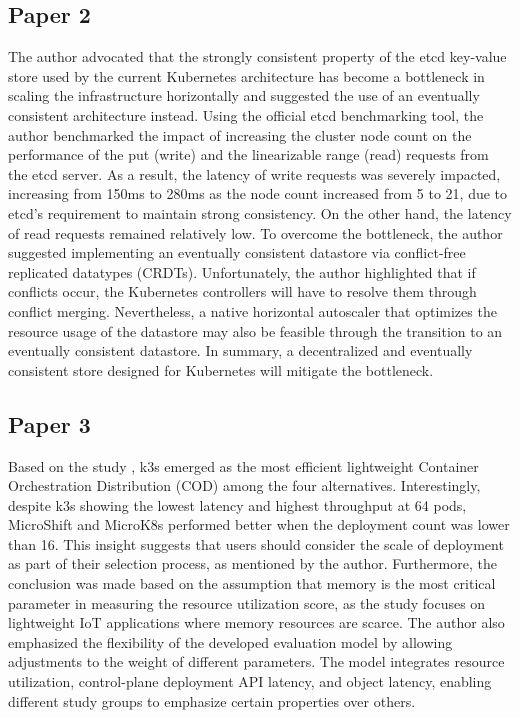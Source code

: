 \subsection{Paper 2}%
\label{sub:Paper 2}
The author \cite{C2} advocated that the strongly consistent property of the etcd key-value store used by the current Kubernetes architecture has become a bottleneck in scaling the infrastructure horizontally and suggested the use of an eventually consistent architecture instead.  
Using the official etcd benchmarking tool, the author benchmarked the impact of increasing the cluster node count on the performance of the put (write) and the linearizable range (read) requests from the etcd server.  
As a result, the latency of write requests was severely impacted, increasing from 150ms to 280ms as the node count increased from 5 to 21, due to etcd's requirement to maintain strong consistency.  
On the other hand, the latency of read requests remained relatively low.  
To overcome the bottleneck, the author suggested implementing an eventually consistent datastore via conflict-free replicated datatypes (CRDTs).  
Unfortunately, the author highlighted that if conflicts occur, the Kubernetes controllers will have to resolve them through conflict merging.  
Nevertheless, a native horizontal autoscaler that optimizes the resource usage of the datastore may also be feasible through the transition to an eventually consistent datastore.  
In summary, a decentralized and eventually consistent store designed for Kubernetes will mitigate the bottleneck.  











\subsection{Paper 3}%
\label{sub:Paper 3}
Based on the study \cite{C3}, k3s emerged as the most efficient lightweight Container Orchestration Distribution (COD) among the four alternatives.  
Interestingly, despite k3s showing the lowest latency and highest throughput at 64 pods, MicroShift and MicroK8s performed better when the deployment count was lower than 16.  
This insight suggests that users should consider the scale of deployment as part of their selection process, as mentioned by the author.  
Furthermore, the conclusion was made based on the assumption that memory is the most critical parameter in measuring the resource utilization score, as the study focuses on lightweight IoT applications where memory resources are scarce.  
The author also emphasized the flexibility of the developed evaluation model by allowing adjustments to the weight of different parameters.  
The model integrates resource utilization, control-plane deployment API latency, and object latency, enabling different study groups to emphasize certain properties over others.  
